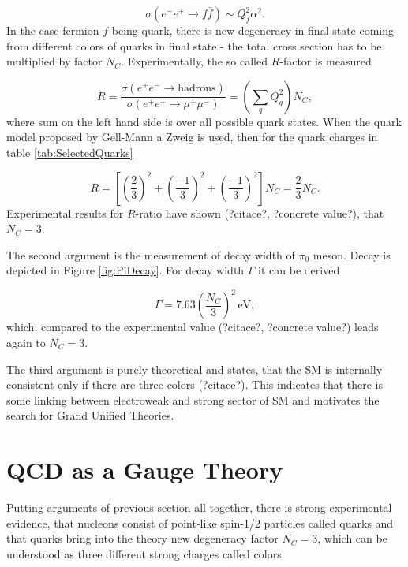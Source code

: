 \begin{equation}
  \sigma (e^- e^+ \rightarrow f \bar{f} ) \sim Q_f^2 \alpha^2.
  \label{eq:NumberOfColorsBasicCrossSection}
\end{equation}
In the case fermion $f$ being quark, there is new degeneracy in final state
coming from different colors of quarks in final state - the total cross section
has to be multiplied by factor $N_C$. Experimentally, the so called $R$-factor
is measured

\begin{equation}
  R = \frac{\sigma(e^+ e^- \rightarrow \text{hadrons})}{\sigma(e^+ e^-
  \rightarrow \mu^+ \mu^-)} = \left( \sum_q Q_q^2 \right) N_C,
  \label{eq:NumberOfColorsRatio}
\end{equation}
where sum on the left hand side is over all possible quark states. When the
quark model proposed by Gell-Mann a Zweig is used, then for the quark charges in table
\ref{tab:SelectedQuarks}

\begin{equation}
  R = \left[ \left( \frac{2}{3} \right)^2 +
    \left( \frac{-1}{3} \right)^2 +
  \left( \frac{-1}{3} \right)^2 \right] N_C = \frac{2}{3}N_C.
  \label{eq:NumberOfColorsSubstitued}
\end{equation}
Experimental results for $R$-ratio have shown (?citace?, ?concrete value?), that
$N_C = 3$.

The second argument is the measurement of decay width of $\pi_0$ meson. Decay is
depicted in Figure \ref{fig:PiDecay}. For decay width $\Gamma$ it can be derived 

\begin{equation}
  \Gamma = 7.63 \left( \frac{N_C}{3} \right)^2 \, \text{eV},
  \label{ex:PiMesonDecayWidth}
\end{equation}
which, compared to the experimental value (?citace?, ?concrete value?) leads
again to $N_C=3$.

The third argument is purely theoretical and states, that the SM is internally
consistent only if there are three colors (?citace?). This indicates that there
is some linking between electroweak and strong sector of SM and motivates the
search for Grand Unified Theories.

\section{QCD as a Gauge Theory}

Putting arguments of previous section all together, there is strong
experimental evidence, that nucleons consist of point-like spin-1/2 particles
called quarks and that quarks bring into the theory new degeneracy factor $N_C =
3$, which can be understood as three different strong charges called colors.

